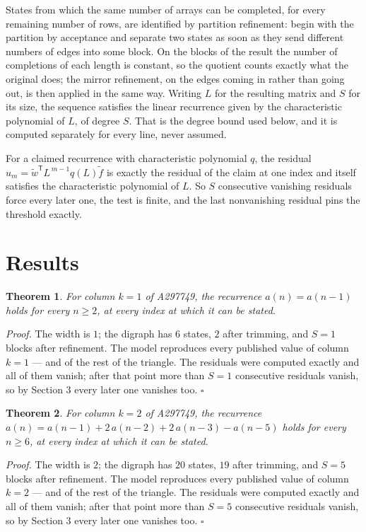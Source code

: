\documentclass[11pt]{article}
\newtheorem{theorem}{Theorem}
\theoremstyle{definition}
\begin{document}
States from which the same number of arrays can be completed, for every remaining number of rows, are identified by partition refinement: begin with the partition by acceptance and separate two states as soon as they send different numbers of edges into some block. On the blocks of the result the number of completions of each length is constant, so the quotient counts exactly what the original does; the mirror refinement, on the edges coming in rather than going out, is then applied in the same way. Writing $L$ for the resulting matrix and $S$ for its size, the sequence satisfies the linear recurrence given by the characteristic polynomial of $L$, of degree $S$. That is the degree bound used below, and it is computed separately for every line, never assumed.

For a claimed recurrence with characteristic polynomial $q$, the residual $u_m = \tilde w^{\mathsf T}L^{\,m-1}q(L)\tilde f$ is exactly the residual of the claim at one index and itself satisfies the characteristic polynomial of $L$. So $S$ consecutive vanishing residuals force every later one, the test is finite, and the last nonvanishing residual pins the threshold exactly.

\section{Results}

\begin{theorem} For column $k = 1$ of A297749, the recurrence $a(n) = a(n-1)$ holds for every $n \ge 2$, at every index at which it can be stated.\end{theorem}

{\itshape Proof.} The width is $1$; the digraph has $6$ states, $2$ after trimming, and $S = 1$ blocks after refinement. The model reproduces every published value of column $k = 1$ --- and of the rest of the triangle. The residuals were computed exactly and all of them vanish; after that point more than $S = 1$ consecutive residuals vanish, so by Section 3 every later one vanishes too. $\square$

\begin{theorem} For column $k = 2$ of A297749, the recurrence $a(n) = a(n-1) + 2\,a(n-2) + 2\,a(n-3) - a(n-5)$ holds for every $n \ge 6$, at every index at which it can be stated.\end{theorem}

{\itshape Proof.} The width is $2$; the digraph has $20$ states, $19$ after trimming, and $S = 5$ blocks after refinement. The model reproduces every published value of column $k = 2$ --- and of the rest of the triangle. The residuals were computed exactly and all of them vanish; after that point more than $S = 5$ consecutive residuals vanish, so by Section 3 every later one vanishes too. $\square$
\end{document}
